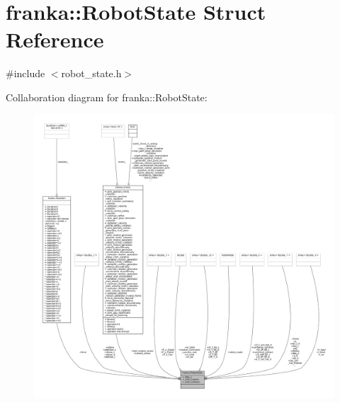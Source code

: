 \hypertarget{structfranka_1_1RobotState}{}\section{franka\+:\+:Robot\+State Struct Reference}
\label{structfranka_1_1RobotState}


{\ttfamily \#include $<$robot\+\_\+state.\+h$>$}



Collaboration diagram for franka\+:\+:Robot\+State\+:
\nopagebreak
\begin{figure}[H]
\begin{center}
\leavevmode
\includegraphics[width=350pt]{structfranka_1_1RobotState__coll__graph}
\end{center}
\end{figure}
